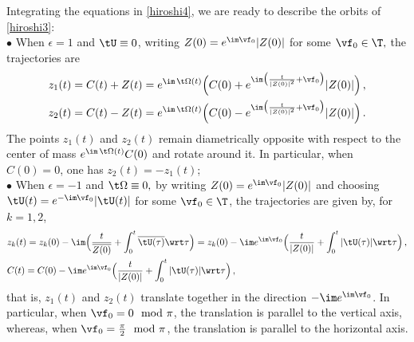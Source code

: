 \documentclass[a4paper,reqno,10pt]{article}
\begin{document}
 \noindent Integrating the equations in \eqref{hiroshi4}, we are ready to describe the orbits of \eqref{hiroshi3}:
\\[1mm]
 \noindent $\bullet$ When $\epsilon =1$ and $\tU\equiv 0$, writing $Z(0)=e^{\im \vf_{0}}|Z(0)|$ for some $\vf_{0}\in\T,$   the trajectories are
 	\begin{equation}
 		\begin{aligned}
 				z_1(t) &= C(t) + Z(t) = e^{\im\,\t\Omega(t)}\Big(C(0) + e^{\im\big(\frac{t}{|Z(0)|^2} +\vf_{0}\big)} |Z(0)| \Big)\,, \\
 				 z_2(t) &= C(t) - Z(t) = e^{\im\,\t\Omega(t)}\Big(C(0) - e^{\im\big(\frac{t}{|Z(0)|^2} +\vf_{0}\big)} |Z(0)| \Big)\,. 
 		\end{aligned}
\end{equation}
The points $z_1(t)$ and $z_2(t)$ remain diametrically opposite with respect to the center of mass $e^{\im\,\t\Omega(t)}C(0)$ and rotate around it. In particular, when $C(0)=0$, one has
$z_2(t) = - z_1(t)$;
 \\[1mm]
 \noindent $\bullet$
 When $\epsilon = -1$ and $\t\Omega\equiv0,$  by writing $Z(0)=e^{\im\vf_{0}}|Z(0)|$ and choosing $\tU(t)=e^{-\im\vf_{0}}|\tU(t)|$ for some $\vf_{0}\in\T$, the trajectories are given by, for $k=1,2$,
 	\begin{equation}\label{point.traj}
\begin{aligned}
		& z_k(t) = z_k(0) -\im\Big( \frac{t}{\overline{Z(0)}} + \int_{0}^t \overline{\tU(\tau)} \wrt\tau  \Big)=  z_k(0)- \im e^{\im\vf_{0}} \Big( \frac{t}{|Z(0)|}  +\int_{0}^t |\tU(\tau)|\wrt \tau  \Big) \,, \\
		& C(t)=C(0)   -  \im e^{\im\vf_{0}}\Big( \frac{t}{|Z(0)|}  +\int_{0}^t |\tU(\tau)| \wrt \tau  \Big) \,,
\end{aligned}
\end{equation}
 	that is, $z_1(t)$ and $z_2(t)$ translate  together  in the direction $-\im e^{\im \vf_{0}}$. In particular, when $\vf_{0}=0 \mod \pi$,  the translation is parallel to the vertical axis, whereas, when $\vf_{0}= \frac{\pi}{2} \mod \pi$, the translation is parallel to the horizontal axis. 

 
\end{document}
